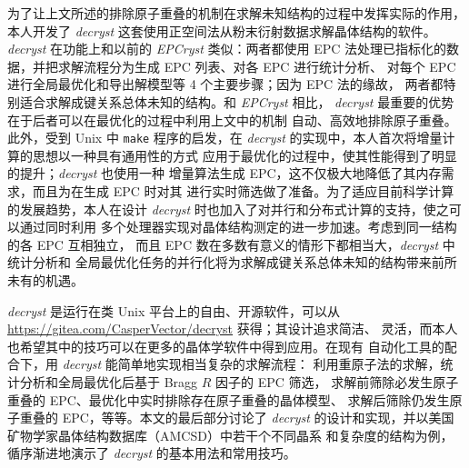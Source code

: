 \begin{cabstract}
	为了让上文所述的排除原子重叠的机制在求解未知结构的过程中发挥实际的作用，
	本人开发了 \emph{decryst} 这套使用正空间法从粉末衍射数据求解晶体结构的软件。
	\emph{decryst} 在功能上和以前的 \emph{EPCryst} 类似：两者都使用 EPC
	法处理已指标化的数据，并把求解流程分为生成 EPC 列表、对各 EPC 进行统计分析、
	对每个 EPC 进行全局最优化和导出解模型等 4 个主要步骤；因为 EPC 法的缘故，
	两者都特别适合求解成键关系总体未知的结构。和 \emph{EPCryst} 相比，%
	\emph{decryst} 最重要的优势在于后者可以在最优化的过程中利用上文中的机制
	自动、高效地排除原子重叠。此外，受到 Unix 中 \verb|make| 程序的启发，在
	\emph{decryst} 的实现中，本人首次将增量计算的思想以一种具有通用性的方式
	应用于最优化的过程中，使其性能得到了明显的提升；\emph{decryst} 也使用一种
	增量算法生成 EPC，这不仅极大地降低了其内存需求，而且为在生成 EPC 时对其
	进行实时筛选做了准备。为了适应目前科学计算的发展趋势，本人在设计
	\emph{decryst} 时也加入了对并行和分布式计算的支持，使之可以通过同时利用
	多个处理器实现对晶体结构测定的进一步加速。考虑到同一结构的各 EPC 互相独立，
	而且 EPC 数在多数有意义的情形下都相当大，\emph{decryst} 中统计分析和
	全局最优化任务的并行化将为求解成键关系总体未知的结构带来前所未有的机遇。

	\emph{decryst} 是运行在类 Unix 平台上的自由、开源软件，可以从
	\url{https://gitea.com/CasperVector/decryst} 获得；其设计追求简洁、
	灵活，而本人也希望其中的技巧可以在更多的晶体学软件中得到应用。在现有
	自动化工具的配合下，用 \emph{decryst} 能简单地实现相当复杂的求解流程：
	利用重原子法的求解，统计分析和全局最优化后基于 Bragg $R$ 因子的 EPC 筛选，
	求解前筛除必发生原子重叠的 EPC、最优化中实时排除存在原子重叠的晶体模型、
	求解后筛除仍发生原子重叠的 EPC，等等。本文的最后部分讨论了 \emph{decryst}
	的设计和实现，并以美国矿物学家晶体结构数据库（AMCSD）中若干个不同晶系
	和复杂度的结构为例，循序渐进地演示了 \emph{decryst} 的基本用法和常用技巧。
\end{cabstract}

